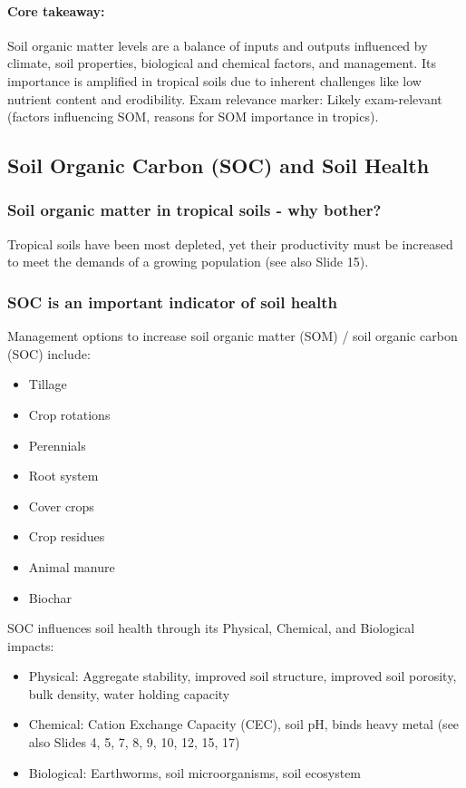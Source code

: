\paragraph*{Core takeaway:} 
Soil organic matter levels are a balance of inputs and outputs influenced by climate, soil properties, biological and chemical factors, and management. Its importance is amplified in tropical soils due to inherent challenges like low nutrient content and erodibility. Exam relevance marker: Likely exam-relevant (factors influencing SOM, reasons for SOM importance in tropics).

\subsection{Soil Organic Carbon (SOC) and Soil Health} \subsubsection*{Soil organic matter in tropical soils - why bother?} 
Tropical soils have been most depleted, yet their productivity must be increased to meet the demands of a growing population (see also Slide 15).

\subsubsection*{SOC is an important indicator of soil health}  
Management options to increase soil organic matter (SOM) / soil organic carbon (SOC) include: 

\begin{itemize} 
    \item Tillage 
    \item Crop rotations 
    \item Perennials 
    \item Root system 
    \item Cover crops 
    \item Crop residues 
    \item Animal manure 
    \item Biochar 
\end{itemize} 

\vspace*{1em}
SOC influences soil health through its Physical, Chemical, and Biological impacts: 

\begin{itemize} 
    \item Physical: Aggregate stability, improved soil structure, improved soil porosity, bulk density, water holding capacity 
    \item Chemical: Cation Exchange Capacity (CEC), soil pH, binds heavy metal (see also Slides 4, 5, 7, 8, 9, 10, 12, 15, 17) 
    \item Biological: Earthworms, soil microorganisms, soil ecosystem 
\end{itemize}

